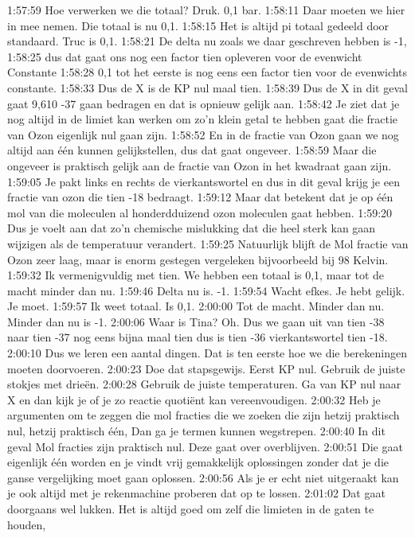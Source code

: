 1:57:59
Hoe verwerken we die totaal? Druk. 0,1 bar.
1:58:11
Daar moeten we hier in mee nemen. Die totaal is nu 0,1.
1:58:15
Het is altijd pi totaal gedeeld door standaard. Truc is 0,1.
1:58:21
De delta nu zoals we daar geschreven hebben is -1,
1:58:25
dus dat gaat ons nog een factor tien opleveren voor de evenwicht Constante
1:58:28
0,1 tot het eerste is nog eens een factor tien voor de evenwichts constante.
1:58:33
Dus de X is de KP nul maal tien.
1:58:39
Dus de X in dit geval gaat 9,610 -37 gaan bedragen en dat is opnieuw gelijk aan.
1:58:42
Je ziet dat je nog altijd in de limiet kan werken om zo'n klein getal te hebben gaat die fractie van Ozon eigenlijk nul gaan zijn.
1:58:52
En in de fractie van Ozon gaan we nog altijd aan één kunnen gelijkstellen, dus dat gaat ongeveer.
1:58:59
Maar die ongeveer is praktisch gelijk aan de fractie van Ozon in het kwadraat gaan zijn.
1:59:05
Je pakt links en rechts de vierkantswortel en dus in dit geval krijg je een fractie van ozon die tien -18 bedraagt.
1:59:12
Maar dat betekent dat je op één mol van die moleculen al honderdduizend ozon moleculen gaat hebben.
1:59:20
Dus je voelt aan dat zo'n chemische mislukking dat die heel sterk kan gaan wijzigen als de temperatuur verandert.
1:59:25
Natuurlijk blijft de Mol fractie van Ozon zeer laag, maar is enorm gestegen vergeleken bijvoorbeeld bij 98 Kelvin.
1:59:32
Ik vermenigvuldig met tien. We hebben een totaal is 0,1, maar tot de macht minder dan nu.
1:59:46
Delta nu is. -1.
1:59:54
Wacht efkes. Je hebt gelijk. Je moet.
1:59:57
Ik weet totaal. Is 0,1.
2:00:00
Tot de macht. Minder dan nu. Minder dan nu is -1.
2:00:06
Waar is Tina? Oh. Dus we gaan uit van tien -38 naar tien -37 nog eens bijna maal tien dus is tien -36 vierkantswortel tien -18.
2:00:10
Dus we leren een aantal dingen. Dat is ten eerste hoe we die berekeningen moeten doorvoeren.
2:00:23
Doe dat stapsgewijs. Eerst KP nul. Gebruik de juiste stokjes met drieën.
2:00:28
Gebruik de juiste temperaturen. Ga van KP nul naar X en dan kijk je of je zo reactie quotiënt kan vereenvoudigen.
2:00:32
Heb je argumenten om te zeggen die mol fracties die we zoeken die zijn hetzij praktisch nul, hetzij praktisch één, Dan ga je termen kunnen wegstrepen.
2:00:40
In dit geval Mol fracties zijn praktisch nul. Deze gaat over overblijven.
2:00:51
Die gaat eigenlijk één worden en je vindt vrij gemakkelijk oplossingen zonder dat je die ganse vergelijking moet gaan oplossen.
2:00:56
Als je er echt niet uitgeraakt kan je ook altijd met je rekenmachine proberen dat op te lossen.
2:01:02
Dat gaat doorgaans wel lukken. Het is altijd goed om zelf die limieten in de gaten te houden,
